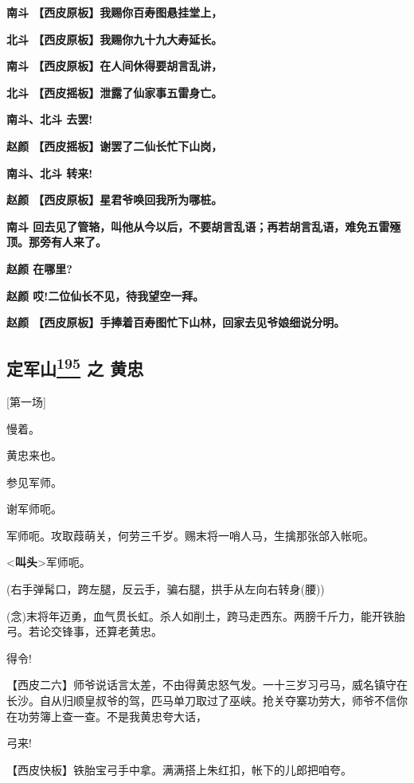 \textbf{南斗 【西皮原板】我赐你百寿图悬挂堂上，}

\textbf{北斗 【西皮原板】我赐你九十九大寿延长。}

\textbf{南斗 【西皮原板】在人间休得要胡言乱讲，}

\textbf{北斗 【西皮摇板】泄露了仙家事五雷身亡。}

\textbf{南斗、北斗 去罢!}

\textbf{赵颜 【西皮摇板】谢罢了二仙长忙下山岗，}

\textbf{南斗、北斗 转来!}

\textbf{赵颜 【西皮原板】星君爷唤回我所为哪桩。}

\textbf{南斗
回去见了管辂，叫他从今以后，不要胡言乱语；再若胡言乱语，难免五雷殛顶。那旁有人来了。}

\textbf{赵颜 在哪里?}

\textbf{赵颜 哎!二位仙长不见，待我望空一拜。}

\textbf{赵颜 【西皮原板】手捧着百寿图忙下山林，回家去见爷娘细说分明。}

\newpage
\hypertarget{ux5b9aux519bux5c71-ux4e4b-ux9ec4ux5fe0}{%
\subsection{\texorpdfstring{定军山\protect\hyperlink{fn195}{\textsuperscript{195}}
之
黄忠}{定军山195 之 黄忠}}\label{ux5b9aux519bux5c71-ux4e4b-ux9ec4ux5fe0}}

{[}第一场{]}

慢着。

黄忠来也。

参见军师。

谢军师呃。

军师呃。攻取葭萌关，何劳三千岁。赐末将一哨人马，生擒那张郃入帐呃。

\textless{}\textbf{叫头}\textgreater{}军师呃。

(右手弹髯口，跨左腿，反云手，骗右腿，拱手从左向右转身(腰))

(念)末将年迈勇，血气贯长虹。杀人如削土，跨马走西东。两膀千斤力，能开铁胎弓。若论交锋事，还算老黄忠。

得令!

【西皮二六】师爷说话言太差，不由得黄忠怒气发。一十三岁习弓马，威名镇守在长沙。自从归顺皇叔爷的驾，匹马单刀取过了巫峡。抢关夺寨功劳大，师爷不信你在功劳簿上查一查。不是我黄忠夸大话，

弓来!

【西皮快板】铁胎宝弓手中拿。满满搭上朱红扣，帐下的儿郎把咱夸。

